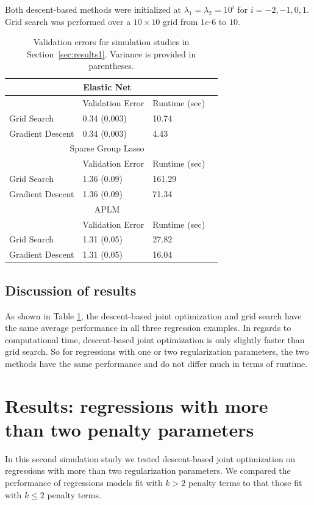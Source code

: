 \documentclass{statsoc}
\begin{document}
Both descent-based methods were initialized at $\lambda_1 = \lambda_2 = 10^i$ for $i=-2, -1, 0, 1$. Grid search was performed over a $10 \times 10$ grid from $1e\text{-}6$ to $10$.
\begin{table}
\caption{\label{table:validation} Validation errors for simulation studies in Section~\ref{sec:results1}. Variance is provided in parentheses.}
\centering
\begin{tabular}{| l | l | l | l | }
\hline
\multicolumn{3}{|c|}{Elastic Net}\\
\hline
 & Validation Error & Runtime (sec) \\
\hline
Grid Search & 0.34 (0.003) & 10.74\\
\hline
Gradient Descent & 0.34 (0.003) & 4.43 \\
\hline
\multicolumn{3}{|c|}{Sparse Group Lasso}\\
\hline
 & Validation Error & Runtime (sec) \\
\hline
Grid Search & 1.36 (0.09) & 161.29 \\
\hline
Gradient Descent  & 1.36 (0.09) & 71.34 \\
\hline
\multicolumn{3}{|c|}{APLM}\\
\hline
 & Validation Error & Runtime (sec) \\
\hline
Grid Search  & 1.31 (0.05) & 27.82 \\
\hline
Gradient Descent  & 1.31 (0.05) & 16.04 \\
\hline
\end{tabular}
\end{table}

\subsection{Discussion of results}
As shown in Table \ref{table:validation}, the descent-based joint optimization and grid search have the same average performance in all three regression examples. In regards to computational time, descent-based joint optimization is only slightly faster than grid search. So for regressions with one or two regularization parameters, the two methods have the same performance and do not differ much in terms of runtime.

\section{Results: regressions with more than two penalty parameters}\label{results2}

In this second simulation study we tested descent-based joint optimization on regressions with more than two regularization parameters. We compared the performance of regressions models fit with $k>2$ penalty terms to that those fit with $k \le 2$ penalty terms.
\end{document}
